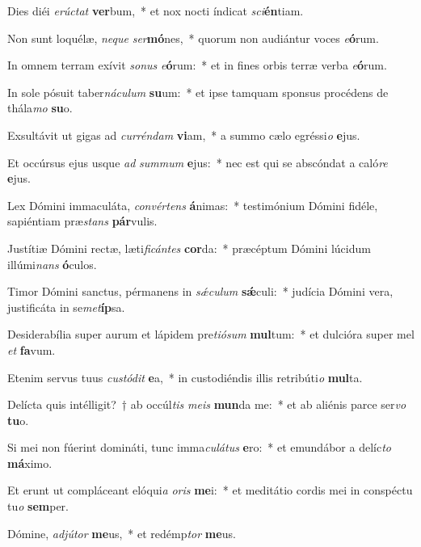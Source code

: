 \item Dies diéi \textit{e}\textit{rúc}\textit{tat} \textbf{ver}bum,~* et nox nocti índicat \textit{sci}\textbf{én}tiam.
\item Non sunt loquélæ, \textit{ne}\textit{que} \textit{ser}\textbf{mó}nes,~* quorum non audiántur voces \textit{e}\textbf{ó}rum.
\item In omnem terram exívit \textit{so}\textit{nus} \textit{e}\textbf{ó}rum:~* et in fines orbis terræ verba \textit{e}\textbf{ó}rum.
\item In sole pósuit taber\textit{ná}\textit{cu}\textit{lum} \textbf{su}um:~* et ipse tamquam sponsus procédens de thála\textit{mo} \textbf{su}o.
\item Exsultávit ut gigas ad \textit{cur}\textit{rén}\textit{dam} \textbf{vi}am,~* a summo cælo egréssi\textit{o} \textbf{e}jus.
\item Et occúrsus ejus usque \textit{ad} \textit{sum}\textit{mum} \textbf{e}jus:~* nec est qui se abscóndat a caló\textit{re} \textbf{e}jus.
\item Lex Dómini immaculáta, \textit{con}\textit{vér}\textit{tens} \textbf{á}nimas:~* testimónium Dómini fidéle, sapiéntiam præ\textit{stans} \textbf{pár}vulis.
\item Justítiæ Dómini rectæ, læti\textit{fi}\textit{cán}\textit{tes} \textbf{cor}da:~* præcéptum Dómini lúcidum illúmi\textit{nans} \textbf{ó}culos.
\item Timor Dómini sanctus, pérmanens in \textit{sǽ}\textit{cu}\textit{lum} \textbf{sǽ}culi:~* judícia Dómini vera, justificáta in se\textit{met}\textbf{íp}sa.
\item Desiderabília super aurum et lápidem pre\textit{ti}\textit{ó}\textit{sum} \textbf{mul}tum:~* et dulcióra super mel \textit{et} \textbf{fa}vum.
\item Etenim servus tuus \textit{cus}\textit{tó}\textit{dit} \textbf{e}a,~* in custodiéndis illis retribúti\textit{o} \textbf{mul}ta.
\item Delícta quis intélligit?~† ab occúl\textit{tis} \textit{me}\textit{is} \textbf{mun}da me:~* et ab aliénis parce ser\textit{vo} \textbf{tu}o.
\item Si mei non fúerint domináti, tunc imma\textit{cu}\textit{lá}\textit{tus} \textbf{e}ro:~* et emundábor a delíc\textit{to} \textbf{má}ximo.
\item Et erunt ut compláceant elóqui\textit{a} \textit{o}\textit{ris} \textbf{me}i:~* et meditátio cordis mei in conspéctu tu\textit{o} \textbf{sem}per.
\item Dómine, \textit{ad}\textit{jú}\textit{tor} \textbf{me}us,~* et redémp\textit{tor} \textbf{me}us.
